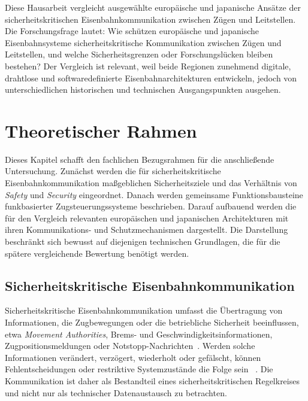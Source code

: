\documentclass[runningheads]{res/llncs}
\begin{document}
Diese Hausarbeit vergleicht ausgewählte europäische und japanische Ansätze der sicherheitskritischen Eisenbahnkommunikation zwischen Zügen und Leitstellen. Die Forschungsfrage lautet: Wie schützen europäische und japanische Eisenbahnsysteme sicherheitskritische Kommunikation zwischen Zügen und Leitstellen, und welche Sicherheitsgrenzen oder Forschungslücken bleiben bestehen? Der Vergleich ist relevant, weil beide Regionen zunehmend digitale, drahtlose und softwaredefinierte Eisenbahnarchitekturen entwickeln, jedoch von unterschiedlichen historischen und technischen Ausgangspunkten ausgehen.

\section{Theoretischer Rahmen}
\label{sec:Theoretischer_Rahmen}

Dieses Kapitel schafft den fachlichen Bezugsrahmen für die anschließende Untersuchung. Zunächst werden die für sicherheitskritische Eisenbahnkommunikation maßgeblichen Sicherheitsziele und das Verhältnis von \textit{Safety} und \textit{Security} eingeordnet. Danach werden gemeinsame Funktionsbausteine funkbasierter Zugsteuerungssysteme beschrieben. Darauf aufbauend werden die für den Vergleich relevanten europäischen und japanischen Architekturen mit ihren Kommunikations- und Schutzmechanismen dargestellt. Die Darstellung beschränkt sich bewusst auf diejenigen technischen Grundlagen, die für die spätere vergleichende Bewertung benötigt werden.

\subsection{Sicherheitskritische Eisenbahnkommunikation}
\label{sec:Sicherheitskritische_Eisenbahnkommunikation}

Sicherheitskritische Eisenbahnkommunikation umfasst die Übertragung von Informationen, die Zugbewegungen oder die betriebliche Sicherheit beeinflussen, etwa \textit{Movement Authorities}, Brems- und Geschwindigkeitsinformationen, Zugpositionsmeldungen oder Notstopp-Nachrichten~\parencite[S. 166--173]{trinckaufETCS2024}. Werden solche Informationen verändert, verzögert, wiederholt oder gefälscht, können Fehlentscheidungen oder restriktive Systemzustände die Folge sein~\parencite[S. 17]{iwamotoTrain2024} . Die Kommunikation ist daher als Bestandteil eines sicherheitskritischen Regelkreises und nicht nur als technischer Datenaustausch zu betrachten.
\end{document}
